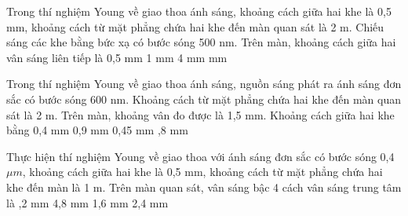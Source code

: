 \begin{ex}%
 Trong thí nghiệm Young về giao thoa ánh sáng, khoảng cách giữa hai khe là 0,5 mm, khoảng cách từ mặt phẳng chứa hai khe đến màn quan sát là 2 m. Chiếu sáng các khe bằng bức xạ có bước sóng 500 nm. Trên màn, khoảng cách giữa hai vân sáng liên tiếp là
\choice
{0,5 mm}
{1 mm}
{4 mm}
{ mm}
\end{ex} 

\begin{ex}%
 Trong thí nghiệm Young về giao thoa ánh sáng, nguồn sáng phát ra ánh sáng đơn sắc có bước sóng 600 nm. Khoảng cách từ mặt phẳng chứa hai khe đến màn quan sát là 2 m. Trên màn, khoảng vân đo được là 1,5 mm. Khoảng cách giữa hai khe bằng
\choice
{0,4 mm}
{0,9 mm}
{0,45 mm}
{,8 mm}
\end{ex} 

\begin{ex}%
Thực hiện thí nghiệm Young về giao thoa với ánh sáng đơn sắc có bước sóng 0,4 $\mu m $, khoảng cách giữa hai khe là 0,5 mm, khoảng cách từ mặt phẳng chứa hai khe đến màn là 1 m. Trên màn quan sát, vân sáng bậc 4 cách vân sáng trung tâm là
\choice
{,2 mm}
{4,8 mm}
{1,6 mm}
{2,4 mm}
\end{ex} 


